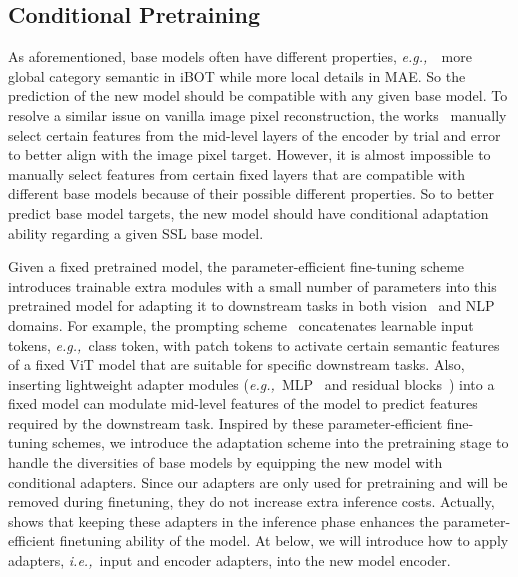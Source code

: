 \documentclass{article} \usepackage{iclr2023_conference,times}
\def\ie{\emph{i.e.,~}}
\def\eg{\emph{e.g.,~}}
\begin{document}
\subsection{Conditional Pretraining}
\label{sec:adapt}
As aforementioned, base models often have different properties, \eg~more global category semantic in iBOT while more local details  in MAE.   
So the prediction of the new model should be compatible with any given base model. 
To resolve a similar issue on vanilla image pixel reconstruction, 
the works~\citep{wang2022repre,dong2022ict,gao2022convmae} manually select certain  features from the mid-level layers of the encoder by trial and error to better align with the image pixel target.   
However, it is almost impossible to manually select features from certain fixed layers that are  compatible with different base models because of their possible different properties.  
So  to better predict base model targets,	
the new model should have conditional adaptation ability regarding
a given SSL base model. 

	
Given a fixed pretrained model, the parameter-efficient fine-tuning scheme introduces   
trainable  extra modules with a small number of parameters 
into this pretrained model for  adapting it to  downstream tasks  in both vision~\citep{jia2022visual,chen2022adaptformer} and NLP~\citep{houlsby2019parameter,li2021prefix,liu2021gpt} domains.
For example,
the prompting scheme~\citep{li2021prefix,liu2021gpt,jia2022visual}
concatenates learnable input tokens, \eg class token, with patch tokens 
to activate certain semantic features of a fixed ViT model that are suitable for specific downstream tasks. 
Also,
inserting lightweight adapter modules (\eg MLP~\citep{houlsby2019parameter,chen2022adaptformer} and residual blocks~\citep{li2022exploring})
into a fixed model can modulate mid-level features of the model to predict features required by the downstream task.
Inspired by these parameter-efficient fine-tuning schemes,
we introduce the adaptation scheme into the pretraining stage 
to handle the diversities of base models
by equipping the new model with conditional adapters. 
Since our adapters are only used for pretraining and will be removed during finetuning,   they do not increase extra inference costs. 
Actually,   shows that keeping these adapters in the inference phase  enhances the parameter-efficient finetuning ability of the model. At below, we will introduce how to apply adapters, \ie input and encoder adapters,
into the new model encoder.
\end{document}
